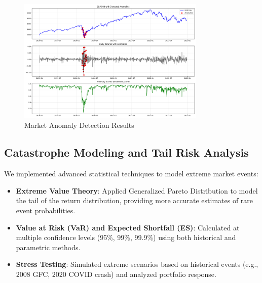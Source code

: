 \documentclass[10pt]{article}
\begin{document}
\begin{figure}[htbp]
	\centering
	\includegraphics[width=0.8\textwidth]{../results/anomalies/anomalies_visualization.png}
	\caption{Market Anomaly Detection Results}
	\label{fig:anomalies}
\end{figure}

\subsection{Catastrophe Modeling and Tail Risk Analysis}
We implemented advanced statistical techniques to model extreme market events:

\begin{itemize}
	\item \textbf{Extreme Value Theory}: Applied Generalized Pareto Distribution to model the tail of the return distribution, providing more accurate estimates of rare event probabilities.

	\item \textbf{Value at Risk (VaR) and Expected Shortfall (ES)}: Calculated at multiple confidence levels (95\%, 99\%, 99.9\%) using both historical and parametric methods.

	\item \textbf{Stress Testing}: Simulated extreme scenarios based on historical events (e.g., 2008 GFC, 2020 COVID crash) and analyzed portfolio response.
\end{itemize}
\end{document}
